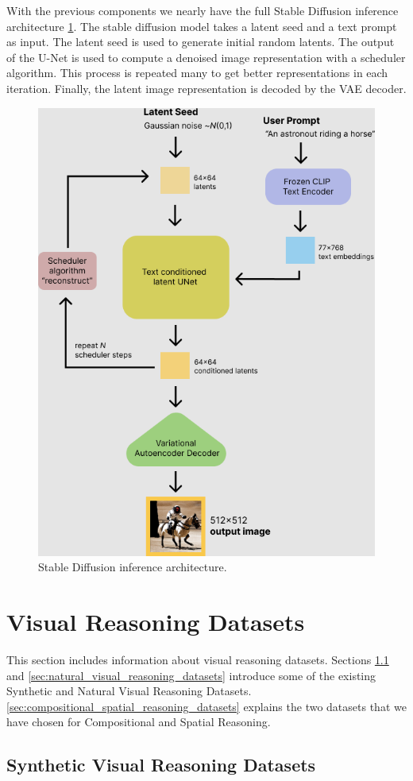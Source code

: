 With the previous components we nearly have the full Stable Diffusion inference architecture \cref{fig:stable_diffusion}. The stable diffusion model takes a latent seed and a text prompt as input. The latent seed is  used to generate initial random latents. The output of the U-Net is used to compute a denoised image representation with a scheduler algorithm. This process is repeated many to get better representations in each iteration. Finally, the latent image representation is decoded by the VAE decoder.

\begin{figure}[ht]
    \centering
    \includegraphics[width=0.6\linewidth]{images/diffusion/stable_diffusion.png}
    \caption{Stable Diffusion inference architecture.}
    \label{fig:stable_diffusion}
\end{figure}

\section{Visual Reasoning Datasets} \label{sec:visual_reasoning_datasets}

This section includes information about visual reasoning datasets. Sections \ref{sec:synthetic_visual_reasoning_datasets} and \ref{sec:natural_visual_reasoning_datasets} introduce some of the existing Synthetic and Natural Visual Reasoning Datasets. \cref{sec:compositional_spatial_reasoning_datasets} explains the two datasets that we have chosen for Compositional and Spatial Reasoning.

\subsection{Synthetic Visual Reasoning Datasets} \label{sec:synthetic_visual_reasoning_datasets}

